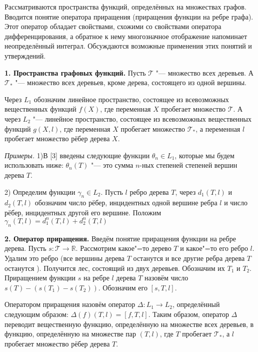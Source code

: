 

\vzmscaption




Рассматриваются пространства функций, определённых на множествах графов.
Вводится понятие оператора приращения (приращения функции на ребре графа).
Этот оператор обладает свойствами, схожими со свойствами оператора дифференцирования,
а обратное к нему многозначное отображение напоминает неопределённый интеграл.
Обсуждаются возможные применения этих понятий и утверждений. 

\textbf{1. Пространства графовых функций.}
Пусть  $\mathcal{T}$ "--- множество всех деревьев.
А $\mathcal{T_*}$ "---  множество всех деревьев, кроме дерева, состоящего из одной вершины.


Через $L_1$ обозначим линейное пространство, состоящее из всевозможных вещественных функций $f(X)$, где переменная $X$ пробегает множество $\mathcal{T}$.
А через $L_2$ "--- линейное пространство, состоящее из всевозможных вещественных функций $g(X,l)$, где переменная $X$ пробегает множество $\mathcal{T}_*$, а переменная $l$ пробегает множество рёбер дерева $X$.

\textit{Примеры.} 
1)В [3] введены следующие функции $\theta_n \in L_1$, которые мы будем использовать ниже:
$\theta_n(T)$ "--- это сумма $n$-ных степеней степеней вершин дерева $T$. 


2) Определим функции $\gamma_n \in L_2$.
Пусть $l$ ребро дерева $ T $, через $d_1(T,l)$ и $d_2(T,l)$ обозначим число рёбер, инцидентных одной вершине ребра $l$ и число рёбер, инцидентных другой его вершине.
Положим $\gamma_n(T,l)=d_1^n(T,l) + d_2^n(T,l)$

\textbf{2. Оператор приращения.}
Введём понятие приращения функции на ребре дерева. Пусть $s: \mathcal{T} \rightarrow \mathbb{R}$. 
Рассмотрим какое"=то дерево $T$  и какое"=то его ребро $l$.  
Удалим это ребро (все вершины дерева $T$ останутся и все другие ребра дерева $T$ останутся ). 
Получится лес, состоящий из двух деревьев.
Обозначим их $T_1$ и $T_2$. 
Приращением функции $s$ на ребре $l$ дерева $T$ назовём число $s(T)- (s(T_1)-s(T_2))$.
Обозначим его $[s, T,l]$.

Оператором приращения назовём оператор $\Delta: L_1 \rightarrow L_2$, определённый следующим образом: $\Delta (f) (T,l)= [f, T, l]$.
Таким образом, оператор $\Delta$ переводит вещественную функцию, определённую на множестве всех деревьев, в функцию, определённую на множестве пар $(T,l)$, где $T$ пробегает $\mathcal{T_*}$, а $l$ пробегает множество рёбер дерева $T$.


